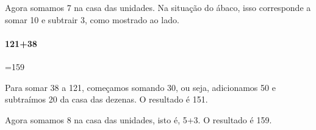 \documentclass[12pt]{book}
\begin{document}
\vspace{0.5cm}
\begin{minipage}{0.4\textwidth}
\end{minipage}%
%
\begin{minipage}{0.5\textwidth}
  Agora somamos 7 na casa das unidades.
  Na situação do ábaco, isso corresponde
  a somar 10 e subtrair 3, como mostrado
  ao lado.
\end{minipage}


\vspace{0.5cm}
\paragraph{121+38}=159\\

\begin{minipage}{0.4\textwidth}
\end{minipage}%
%
\begin{minipage}{0.5\textwidth}
  Para somar 38 a 121, começamos somando 30,
  ou seja, adicionamos 50 e subtraímos 20
  da casa das dezenas. O resultado é 151.
\end{minipage}

\vspace{0.4cm}
\begin{minipage}{0.4\textwidth}
\end{minipage}%
%
\begin{minipage}{0.5\textwidth}
  Agora somamos 8 na casa das unidades,
  isto é, 5+3. O resultado é 159.
\end{minipage}
\end{document}
